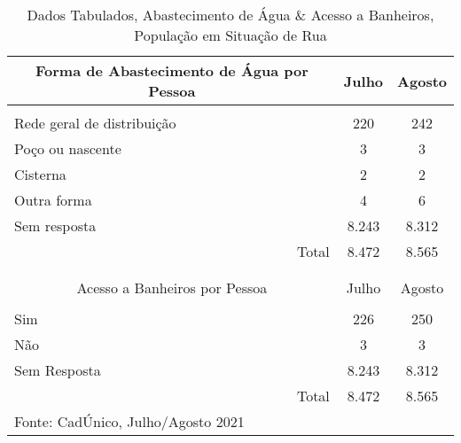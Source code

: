 \documentclass[12pt]{article}
\begin{document}
\begin{table}[htbp]
  \centering
  \caption{Dados Tabulados, Abastecimento de Água \& Acesso a Banheiros, População em Situação de Rua}
    \begin{tabular}{p{23.5em}rr}
    \hline
    \multicolumn{1}{c}{Forma de Abastecimento de Água por Pessoa} & \multicolumn{1}{c}{Julho} & \multicolumn{1}{c}{Agosto} \\
    \midrule
    \multicolumn{1}{r}{} &      &  \\
    \multicolumn{1}{l}{Rede geral de distribuição} & \multicolumn{1}{c}{220} & \multicolumn{1}{c}{242} \\
    \multicolumn{1}{l}{Poço ou nascente} & \multicolumn{1}{c}{3} & \multicolumn{1}{c}{3} \\
    \multicolumn{1}{l}{Cisterna} & \multicolumn{1}{c}{2} & \multicolumn{1}{c}{2} \\
    \multicolumn{1}{l}{Outra forma} & \multicolumn{1}{c}{4} & \multicolumn{1}{c}{6} \\
    \multicolumn{1}{l}{Sem resposta} & \multicolumn{1}{c}{8.243} & \multicolumn{1}{c}{8.312} \\
    \midrule
    \multicolumn{1}{r}{Total} & \multicolumn{1}{c}{8.472} & \multicolumn{1}{c}{8.565} \\
    \midrule
    \multicolumn{1}{r}{} &      &  \\
    \multicolumn{1}{r}{} &      &  \\
    \midrule
    \multicolumn{1}{c}{Acesso a Banheiros  por Pessoa} & \multicolumn{1}{c}{Julho} & \multicolumn{1}{c}{Agosto} \\
    \midrule
    \multicolumn{1}{l}{} &      &  \\
    \multicolumn{1}{l}{Sim} & \multicolumn{1}{c}{226} & \multicolumn{1}{c}{250} \\
    \multicolumn{1}{l}{Não} & \multicolumn{1}{c}{3} & \multicolumn{1}{c}{3} \\
    \multicolumn{1}{l}{Sem Resposta} & \multicolumn{1}{c}{8.243} & \multicolumn{1}{c}{8.312} \\
    \midrule
    \multicolumn{1}{r}{Total} & \multicolumn{1}{c}{8.472} & \multicolumn{1}{c}{8.565} \\
    \midrule
    Fonte: CadÚnico, Julho/Agosto 2021 &      &  \\
    \end{tabular}%
  \label{tab:tab4}%
\end{table}%
\end{document}
